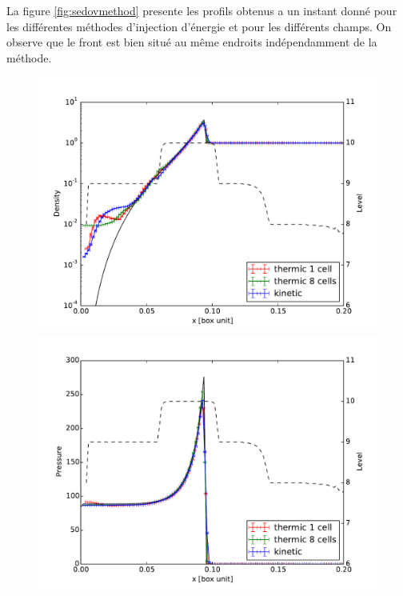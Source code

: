 La figure \ref{fig:sedovmethod} presente les profils obtenus a un instant donné pour les différentes méthodes d'injection d'énergie et pour les différents champs.
On observe que le front est bien situé au même endroits indépendamment de la méthode.

\begin{figure}[htpb]
        \includegraphics[height=.3\textheight]{img/03/sedov/sedov_comp_profile_den.pdf} 
		\includegraphics[height=.3\textheight]{img/03/sedov/sedov_comp_profile_pres.pdf} 

\end{figure}
